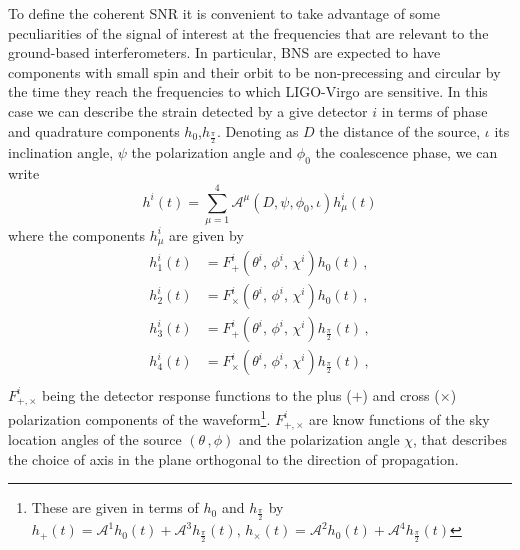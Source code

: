 \documentclass[aps, prd, twocolumn, superscriptaddress, nofootinbib]{revtex4-1}
\begin{document}
To define the coherent SNR it is convenient to take advantage of some peculiarities of the signal of interest at the frequencies that are relevant to the ground-based interferometers. In particular, BNS are expected to have components with small spin and their orbit to be non-precessing and circular by the time they reach the frequencies to which LIGO-Virgo are sensitive.
In this case we can describe the strain detected by a give  detector $i$ in terms of phase and quadrature components $h_0$,$h_{ \frac{\pi}{2}}$. Denoting as $D$ the distance of the source, $\iota$ its inclination angle, $\psi$ the polarization angle and $\phi_0$ the coalescence phase, we can write
\begin{equation}\label{singledetectorsignalAmu}
h^i(t)=\sum^4_{\mu=1}\mathcal{A}^\mu(D,\psi,\phi_0,\iota)h^i_\mu(t)
\end{equation}
where the components $h_\mu^i$ are given by
\begin{equation}
\begin{split}
h_1^i(t)&=F^i_+(\theta^i,\, \phi^i,\, \chi^i)h_0(t) \, , \\
h_2^i(t)&=F^i_\times( \theta^i,\, \phi^i,\, \chi^i)h_0(t) \, , \\
h_3^i(t)&=F^i_+(\theta^i,\, \phi^i,\, \chi^i)h_{\frac{\pi}{2}}(t) \, , \\
h_4^i(t)&=F^i_\times(\theta^i,\, \phi^i,\, \chi^i)h_{\frac{\pi}{2}}(t) \, , \\
\end{split}
\end{equation}
$F^i_{+,\times}$ being the detector response functions to the plus ($+$) and cross ($\times$) polarization components of the waveform\footnote{These are given in terms of $h_0$ and $h_{ \frac{\pi}{2}}$ by $h_+(t)=\mathcal{A}^1h_0(t)+\mathcal{A}^3h_{ \frac{\pi}{2}}(t),\, h_\times(t)=\mathcal{A}^2h_0(t)+\mathcal{A}^4h_{ \frac{\pi}{2}}(t)$}. $F^i_{+,\times}$ are know functions of the sky location angles of the source $(\theta\,,\phi)$ and the polarization angle $\chi$, that describes the choice of axis in the plane orthogonal to the direction of propagation.
\end{document}

